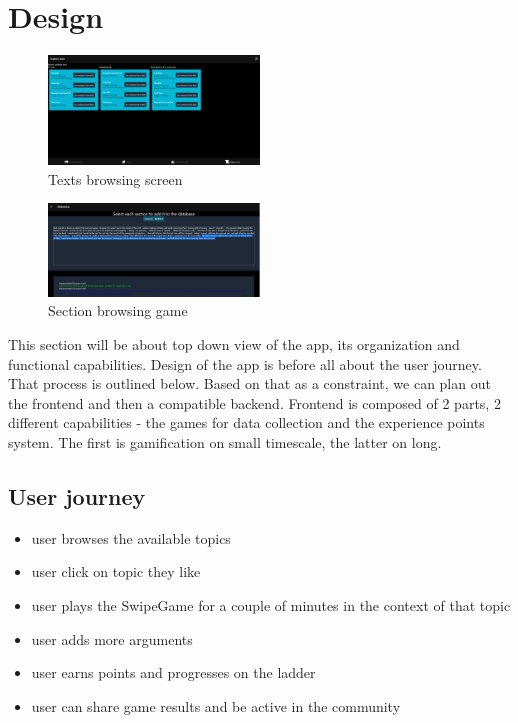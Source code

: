 \documentclass{report}
\begin{document}
\chapter{Design}

\begin{figure}[h]
    \centering
    \includegraphics[width=0.5\textwidth]{./images/browse-texts.png}
    \caption{Texts browsing screen}
\end{figure}

\begin{figure}[h]
    \centering
    \includegraphics[width=0.5\textwidth]{./images/section-reader.png}
    \caption{Section browsing game}
\end{figure}

This section will be about top down view of the app, its organization and functional capabilities.
Design of the app is before all about the user journey. That process is outlined below. Based on that as a constraint, we can plan out the frontend and then a compatible backend.
Frontend is composed of 2 parts, 2 different capabilities - the games for data collection and the experience points system. The first is gamification on small timescale, the latter on long.

\section{User journey}
\begin{itemize}
  \item user browses the available topics
  \item user click on topic they like
  \item user plays the SwipeGame for a couple of minutes in the context of that topic
  \item user adds more arguments
  \item user earns points and progresses on the ladder
  \item user can share game results and be active in the community
\end{itemize}
\end{document}
